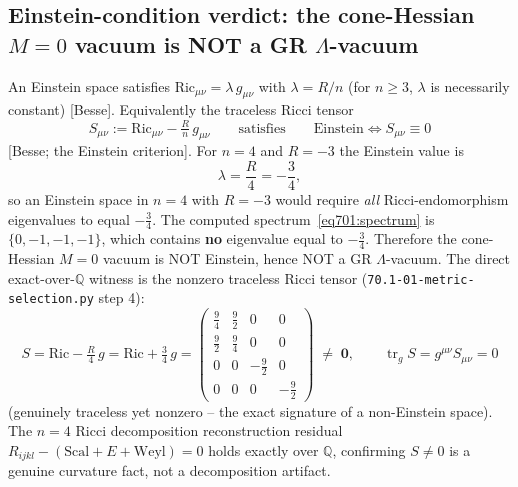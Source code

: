 \subsection{Einstein-condition verdict: the cone-Hessian $M=0$ vacuum is NOT a GR
            $\Lambda$-vacuum}
\label{sec701:einstein}

An Einstein space satisfies $\mathrm{Ric}_{\mu\nu}=\lambda\,g_{\mu\nu}$ with
$\lambda=R/n$ (for $n\ge3$, $\lambda$ is necessarily constant) [Besse]. Equivalently the
traceless Ricci tensor
\begin{equation}
  S_{\mu\nu} := \mathrm{Ric}_{\mu\nu}-\tfrac{R}{n}\,g_{\mu\nu}
  \qquad\text{satisfies}\qquad
  \text{Einstein}\iff S_{\mu\nu}\equiv 0
  \label{eq701:tracelessricci}
\end{equation}
[Besse; the Einstein criterion]. For $n=4$ and $R=-3$ the Einstein value is
\begin{equation}
  \lambda = \frac{R}{4} = -\frac34,
  \label{eq701:einstein-value}
\end{equation}
so an Einstein space in $n=4$ with $R=-3$ would require \emph{all} Ricci-endomorphism
eigenvalues to equal $-\tfrac34$. The computed spectrum~\eqref{eq701:spectrum} is
$\{0,-1,-1,-1\}$, which contains \textbf{no} eigenvalue equal to $-\tfrac34$. Therefore
the cone-Hessian $M=0$ vacuum is NOT Einstein, hence NOT a GR $\Lambda$-vacuum. The
direct exact-over-$\mathbb{Q}$ witness is the nonzero traceless Ricci tensor
(\texttt{70.1-01-metric-selection.py} step 4):
\begin{equation}
  S = \mathrm{Ric}-\tfrac{R}{4}\,g
    = \mathrm{Ric}+\tfrac34\,g
    =
  \begin{pmatrix} \tfrac94 & \tfrac92 & 0 & 0\\
                  \tfrac92 & \tfrac94 & 0 & 0\\
                  0 & 0 & -\tfrac92 & 0\\
                  0 & 0 & 0 & -\tfrac92\end{pmatrix}
  \;\neq\; \mathbf{0},
  \qquad \operatorname{tr}_g S = g^{\mu\nu}S_{\mu\nu} = 0
  \label{eq701:S}
\end{equation}
(genuinely traceless yet nonzero -- the exact signature of a non-Einstein space). The
$n=4$ Ricci decomposition reconstruction residual $R_{ijkl}-(\mathrm{Scal}+E+\mathrm{Weyl})=0$
holds exactly over $\mathbb{Q}$, confirming $S\neq0$ is a genuine curvature fact, not a
decomposition artifact.

